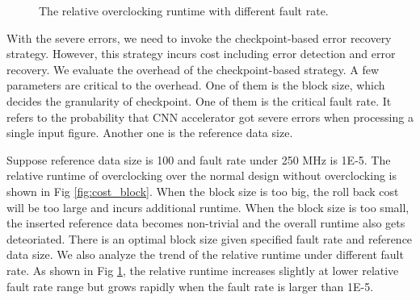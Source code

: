 \begin{figure}
    \caption{The relative overclocking runtime with different fault rate.}
\label{fig:cost_probability}
\vspace{-1em}
\end{figure}


With the severe errors, we need to invoke the checkpoint-based error recovery strategy. 
However, this strategy incurs cost including error detection and error recovery. 
We evaluate the overhead of the checkpoint-based strategy. 
A few parameters are critical to the overhead. One of them is the block size, which 
decides the granularity of checkpoint. One of them is the critical 
fault rate. It refers to the probability that CNN accelerator got severe errors 
when processing a single input figure. Another one is the reference data size.


Suppose reference data size is 100 and fault rate under 250 MHz is 1E-5. The relative runtime 
of overclocking over the normal design without overclocking is shown 
in Fig \ref{fig:cost_block}. When the block size is too big, the roll back cost will be 
too large and incurs additional runtime. When the block size is too small, the inserted 
reference data becomes non-trivial and the overall runtime also gets deteoriated. There is 
an optimal block size given specified fault rate and reference data size.
We also analyze the trend of the relative runtime under different fault rate.
As shown in Fig \ref{fig:cost_probability}, the relative runtime increases slightly at 
lower relative fault rate range but grows rapidly when the fault rate is larger than 1E-5.


